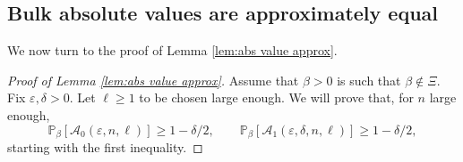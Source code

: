 \documentclass[11pt,a4paper]{article}
\numberwithin{equation}{section}
\theoremstyle{plain}
\theoremstyle{definition}
\begin{document}
\subsection{Bulk absolute values are approximately equal}


We now turn to the proof of Lemma \ref{lem:abs value approx}. 

\begin{proof}[Proof of Lemma \textup{\ref{lem:abs value approx}}] Assume that $\beta>0$ is such that $\beta\notin \Xi$. Fix $\varepsilon,\delta>0$. Let $\ell\geq 1$ to be chosen large enough. We will prove that, for $n$ large enough,
\begin{equation}\label{eq:A_0 and A_1 ineq}
    \mathbb P_\beta[\mathcal{A}_0(\varepsilon,n,\ell)]\geq 1-\delta/2, \qquad \mathbb P_\beta[\mathcal{A}_1(\varepsilon,\delta,n,\ell)]\geq 1-\delta/2,
\end{equation}
starting with the first inequality.


\end{proof}
\end{document}
